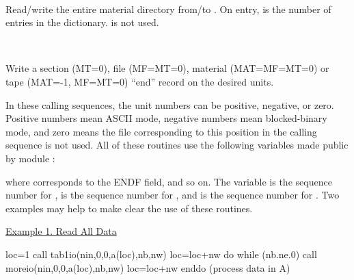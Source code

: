 \begin{description}
\begin{singlespace}
\item[\cword{dictio(nin,nout,nscr,a,nb,nw)}] ~\par
Read/write the entire material directory from/to .  On entry,
 is the number of entries in the dictionary.  
is not used.

\item[\cword{asend(nout,ncr)}]

\item[\cword{afend(nout,nscr)}]

\item[\cword{amend(nout,nscr)}]

\item[\cword{atend(nout,nscr)}] ~\par
Write a section (MT=0), file (MF=MT=0), material (MAT=MF=MT=0) or tape
(MAT=-1, MF=MT=0) ``end'' record on the desired units.
\end{singlespace}
\end{description}

In these calling sequences, the unit numbers can be positive,
negative, or zero.  Positive numbers mean ASCII mode, negative
numbers mean blocked-binary mode, and zero means the file
corresponding to this position in the calling sequence is not
used.  All of these routines use the following variables made
public by module :

\begin{quote}
\end{quote}
where  corresponds to the ENDF  field, and so on.
The variable  is the sequence number for ,
 is the sequence number for , and 
is the sequence number for .  Two examples may help to make
clear the use of these routines.

\begin{center}
{\underline{Example 1.  Read All Data}}
\end{center}

\small
\begin{ccode}

      loc=1
      call tab1io(nin,0,0,a(loc),nb,nw)
      loc=loc+nw
      do while (nb.ne.0)
         call moreio(nin,0,0,a(loc),nb,nw)
         loc=loc+nw
      enddo
      (process data in A)

\end{ccode}
\normalsize

